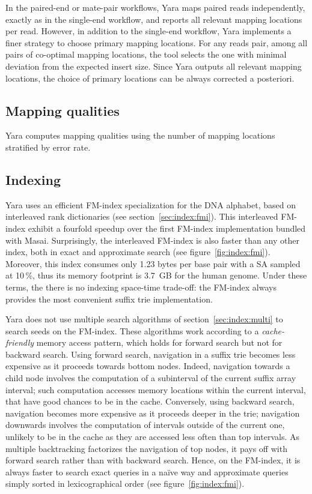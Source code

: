 In the paired-end or mate-pair workflows, Yara maps paired reads independently, exactly as in the single-end workflow, and reports all relevant mapping locations per read.
However, in addition to the single-end workflow, Yara implements a finer strategy to choose primary mapping locations.
For any reads pair, among all pairs of co-optimal mapping locations, the tool selects the one with minimal deviation from the expected insert size.
Since Yara outputs all relevant mapping locations, the choice of primary locations can be always corrected a posteriori.

\subsection{Mapping qualities}
\label{sec:yara:eng:qualities}
Yara computes mapping qualities using the number of mapping locations stratified by error rate.

\subsection{Indexing}
\label{sec:yara:eng:indexing}
Yara uses an efficient FM-index specialization for the DNA alphabet, based on interleaved rank dictionaries (see section~\ref{sec:index:fmi}).
This interleaved FM-index exhibit a fourfold speedup over the first FM-index implementation bundled with Masai.
Surprisingly, the interleaved FM-index is also faster than any other index, both in exact and approximate search (see figure~\ref{fig:index:fmi}).
Moreover, this index consumes only 1.23 bytes per base pair with a SA sampled at 10\,\%, thus its memory footprint is 3.7~GB for the human genome.
Under these terms, the there is no indexing space-time trade-off: the FM-index always provides the most convenient suffix trie implementation.

Yara does not use multiple search algorithms of section~\ref{sec:index:multi} to search seeds on the FM-index.
These algorithms work according to a \emph{cache-friendly} memory access pattern, which holds for forward search but not for backward search.
Using forward search, navigation in a suffix trie becomes less expensive as it proceeds towards bottom nodes.
Indeed, navigation towards a child node involves the computation of a subinterval of the current suffix array interval; such computation accesses memory locations within the current interval, that have good chances to be in the cache.
Conversely, using backward search, navigation becomes more expensive as it proceeds deeper in the trie; navigation downwards involves the computation of intervals outside of the current one, unlikely to be in the cache as they are accessed less often than top intervals.
As multiple backtracking factorizes the navigation of top nodes, it pays off with forward search rather than with backward search.
Hence, on the FM-index, it is always faster to search exact queries in a na\"ive way and approximate queries simply sorted in lexicographical order (see figure~\ref{fig:index:fmi}).

